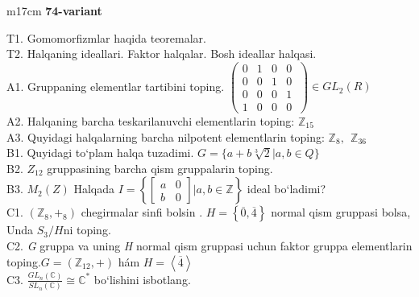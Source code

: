 \documentclass{article}
\begin{document}
\begin{tabular}{m{17cm}}
\textbf{74-variant}
\newline

T1. Gomomorfizmlar haqida teoremalar. \\
T2. Halqaning ideallari. Faktor halqalar. Bosh ideallar halqasi. \\
A1. Gruppaning elementlar tartibini toping. \(\left( \begin{matrix}
0 & 1 & 0 & 0 \\
0 & 0 & 1 & 0 \\
0 & 0 & 0 & 1 \\
1 & 0 & 0 & 0
\end{matrix}\  \right) \in GL_{2}(R)\) \\
A2. Halqaning barcha teskarilanuvchi elementlarin toping: \(\mathbb{Z}_{15}\) \\
A3. Quyidagi halqalarning barcha nilpotent elementlarin toping: \(\mathbb{Z}_{8},\ \ \mathbb{Z}_{36}\) \\
B1. Quyidagi to`plam halqa tuzadimi. \(G = \{ a + b\sqrt[3]{2}|a,b \in Q\}\) \\
B2. \(Z_{12}\) gruppasining barcha qism gruppalarin toping. \\
B3. \(M_{2}(Z)\) Halqada \(I = \left\{ \begin{bmatrix}
a & 0 \\
b & 0
\end{bmatrix}|a,b\mathbb{\in Z} \right\}\) ideal bo`ladimi? \\
C1. \(\left( \mathbb{Z}_{8}, +_{8} \right)\) chegirmalar sinfi bo\textquotesingle lsin . \(H = \left\{ \overline{0},\overline{4} \right\}\) normal qism gruppasi bolsa, Unda \(S_{3}/H\)ni toping. \\
C2. \emph{G} gruppa va uning \emph{H} normal qism gruppasi uchun faktor gruppa elementlarin toping.\(G = (\mathbb{Z}_{12}, + )\) hám \(H = \left\langle \overline{4} \right\rangle\) \\
C3. \(\frac{GL_{n}(\mathbb{C})}{SL_{n}(\mathbb{C})} \cong \mathbb{C}^{*}\) bo`lishini isbotlang.
 \\

\end{tabular}
\vspace{1cm}
\end{document}
